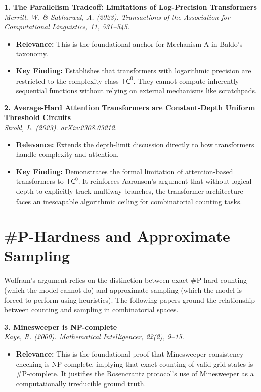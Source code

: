 \documentclass[12pt,a4paper]{article}
\begin{document}
\vspace{1em}
\noindent\textbf{1. The Parallelism Tradeoff: Limitations of Log-Precision Transformers}\\
\textit{Merrill, W. \& Sabharwal, A. (2023). Transactions of the Association for Computational Linguistics, 11, 531--545.}
\begin{itemize}
    \item \textbf{Relevance:} This is the foundational anchor for Mechanism A in Baldo's taxonomy.
    \item \textbf{Key Finding:} Establishes that transformers with logarithmic precision are restricted to the complexity class $\mathsf{TC}^0$. They cannot compute inherently sequential functions without relying on external mechanisms like scratchpads.
\end{itemize}

\vspace{1em}
\noindent\textbf{2. Average-Hard Attention Transformers are Constant-Depth Uniform Threshold Circuits}\\
\textit{Strobl, L. (2023). arXiv:2308.03212.}
\begin{itemize}
    \item \textbf{Relevance:} Extends the depth-limit discussion directly to how transformers handle complexity and attention.
    \item \textbf{Key Finding:} Demonstrates the formal limitation of attention-based transformers to $\mathsf{TC}^0$. It reinforces Aaronson's argument that without logical depth to explicitly track multiway branches, the transformer architecture faces an inescapable algorithmic ceiling for combinatorial counting tasks.
\end{itemize}

\section{\#P-Hardness and Approximate Sampling}

Wolfram's argument relies on the distinction between exact \#P-hard counting (which the model cannot do) and approximate sampling (which the model is forced to perform using heuristics). The following papers ground the relationship between counting and sampling in combinatorial spaces.

\vspace{1em}
\noindent\textbf{3. Minesweeper is NP-complete}\\
\textit{Kaye, R. (2000). Mathematical Intelligencer, 22(2), 9--15.}
\begin{itemize}
    \item \textbf{Relevance:} This is the foundational proof that Mine\-sweeper consistency checking is NP-complete, implying that exact counting of valid grid states is \#P-complete. It justifies the Rosencrantz protocol's use of Minesweeper as a computationally irreducible ground truth.
\end{itemize}
\end{document}
